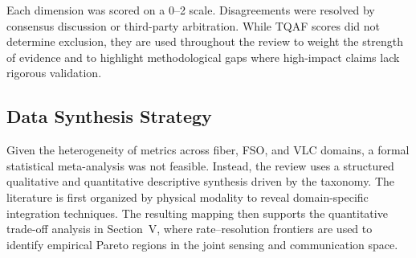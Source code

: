 Each dimension was scored on a 0--2 scale. Disagreements were resolved by consensus discussion or third-party arbitration. While TQAF scores did not determine exclusion, they are used throughout the review to weight the strength of evidence and to highlight methodological gaps where high-impact claims lack rigorous validation.

\subsection{Data Synthesis Strategy}
Given the heterogeneity of metrics across fiber, FSO, and VLC domains, a formal statistical meta-analysis was not feasible. Instead, the review uses a structured qualitative and quantitative descriptive synthesis driven by the taxonomy. The literature is first organized by physical modality to reveal domain-specific integration techniques. The resulting mapping then supports the quantitative trade-off analysis in Section~V, where rate--resolution frontiers are used to identify empirical Pareto regions in the joint sensing and communication space.
